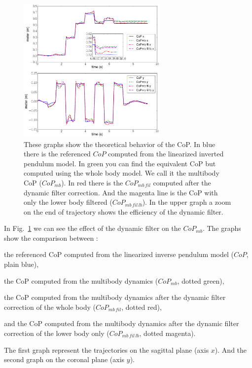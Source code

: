 \begin{figure}[ht]
  \begin{center}
    \includegraphics[width=0.65\textwidth, keepaspectratio]{copmb.pdf}
    \caption{These graphs show the theoretical behavior of the CoP. In blue
there is the referenced $CoP$ computed from the linearized inverted pendulum model. In
green you can find the equivalent CoP but computed using the whole body
model. We call it the multibody CoP ($CoP_{mb}$). In red there is the
$CoP_{mb\,fil}$ computed after the dynamic filter correction. And the
magenta line is the CoP with only the lower body filtered
($CoP_{mb\,fil\,lb}$).
In the upper graph a zoom on the end of trajectory shows the efficiency of the dynamic filter.}
    \label{fig:zmpmb}
  \end{center}
\end{figure}
%
In Fig.~\ref{fig:zmpmb} we can see the effect of the dynamic filter on the
$CoP_{mb}$.
The graphs show the comparison between :
\begin{list}{ .}{%
		\setlength{\topsep}{5pt}%
		\setlength{\itemsep}{0pt}%
		\setlength{\parsep}{0pt}%
		\setlength{\labelwidth}{3.em}%
		\setlength{\leftmargin}{2em}%
		\setlength{\labelsep}{0.5em}%
	}
\item[\bluesquare] the referenced CoP computed from the linearized inverse pendulum model ($CoP$, plain blue),
\item[\bluesquare] the CoP computed from the multibody dynamics ($CoP_{mb}$, dotted green),
\item[\bluesquare] the CoP computed from the multibody dynamics after the dynamic filter correction of the whole body ($CoP_{mb\,fil}$, dotted red),
\item[\bluesquare] and the CoP computed from the multibody dynamics after the dynamic filter correction of the lower body only ($CoP_{mb\,fil\,lb}$, dotted magenta).
\end{list}
The first graph represent the trajectories on the sagittal plane (axis $x$).
And the second graph on the coronal plane (axis $y$).

